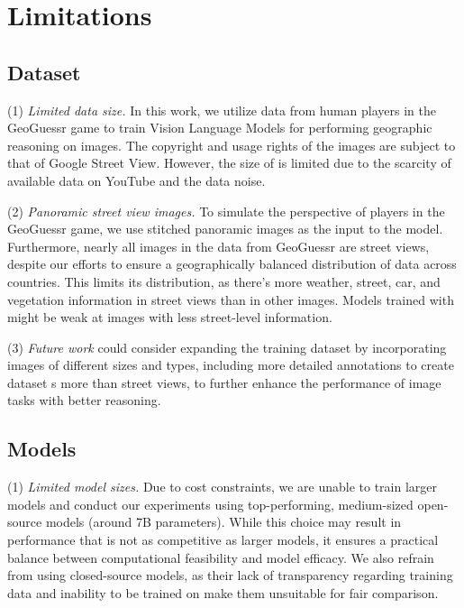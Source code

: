 \section*{Limitations}

\subsection*{Dataset} 

(1) \textit{Limited data size.} In this work, we utilize data from human players in the GeoGuessr game to train Vision Language Models for performing geographic reasoning on images. The copyright and usage rights of the images are subject to that of Google Street View. However, the size of \dataname is limited due to the scarcity of available data on YouTube and the data noise. 

(2) \textit{Panoramic street view images.} To simulate the perspective of players in the GeoGuessr game, we use stitched panoramic images as the input to the model. Furthermore, nearly all images in the data from GeoGuessr are street views, despite our efforts to ensure a geographically balanced distribution of data across countries. This limits its distribution, as there's more weather, street, car, and vegetation information in street views than in other images. Models trained with \dataname might be weak at images with less street-level information. 

(3) \textit{Future work} could consider expanding the training dataset by incorporating images of different sizes and types, including more detailed annotations to create dataset s more than street views, to further enhance the performance of image \geoloc tasks with better reasoning.

\subsection*{Models} 

(1) \textit{Limited model sizes.} Due to cost constraints, we are unable to train larger models and conduct our experiments using top-performing, medium-sized open-source models (around 7B parameters). While this choice may result in performance that is not as competitive as larger models, it ensures a practical balance between computational feasibility and model efficacy. We also refrain from using closed-source models, as their lack of transparency regarding training data and inability to be trained on \dataname make them unsuitable for fair comparison. 


